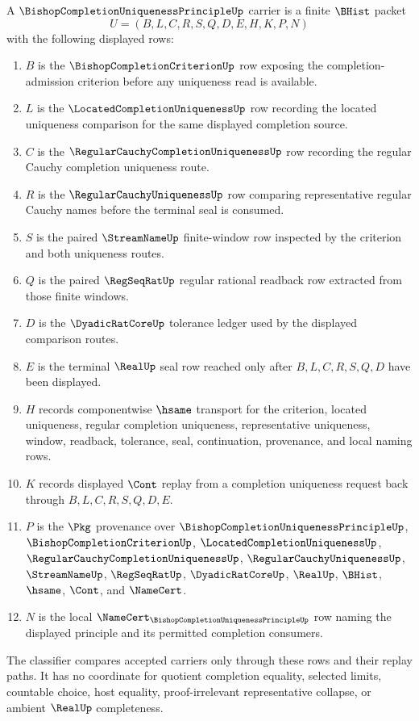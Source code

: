 \begin{definition}
\label{def:bishop-completion-uniqueness-principle-carrier}
A $\BishopCompletionUniquenessPrincipleUp$ carrier is a finite $\BHist$ packet
$$
U=(B,L,C,R,S,Q,D,E,H,K,P,N)
$$
with the following displayed rows:
\begin{enumerate}
\item $B$ is the $\BishopCompletionCriterionUp$ row exposing the completion-admission criterion before any uniqueness read is available.
\item $L$ is the $\LocatedCompletionUniquenessUp$ row recording the located uniqueness comparison for the same displayed completion source.
\item $C$ is the $\RegularCauchyCompletionUniquenessUp$ row recording the regular Cauchy completion uniqueness route.
\item $R$ is the $\RegularCauchyUniquenessUp$ row comparing representative regular Cauchy names before the terminal seal is consumed.
\item $S$ is the paired $\StreamNameUp$ finite-window row inspected by the criterion and both uniqueness routes.
\item $Q$ is the paired $\RegSeqRatUp$ regular rational readback row extracted from those finite windows.
\item $D$ is the $\DyadicRatCoreUp$ tolerance ledger used by the displayed comparison routes.
\item $E$ is the terminal $\RealUp$ seal row reached only after $B,L,C,R,S,Q,D$ have been displayed.
\item $H$ records componentwise $\hsame$ transport for the criterion, located uniqueness, regular completion uniqueness, representative uniqueness, window, readback, tolerance, seal, continuation, provenance, and local naming rows.
\item $K$ records displayed $\Cont$ replay from a completion uniqueness request back through $B,L,C,R,S,Q,D,E$.
\item $P$ is the $\Pkg$ provenance over $\BishopCompletionUniquenessPrincipleUp$, $\BishopCompletionCriterionUp$, $\LocatedCompletionUniquenessUp$, $\RegularCauchyCompletionUniquenessUp$, $\RegularCauchyUniquenessUp$, $\StreamNameUp$, $\RegSeqRatUp$, $\DyadicRatCoreUp$, $\RealUp$, $\BHist$, $\hsame$, $\Cont$, and $\NameCert$.
\item $N$ is the local $\NameCert_{\BishopCompletionUniquenessPrincipleUp}$ row naming the displayed principle and its permitted completion consumers.
\end{enumerate}
The classifier compares accepted carriers only through these rows and their replay paths. It has no coordinate for quotient completion equality, selected limits, countable choice, host equality, proof-irrelevant representative collapse, or ambient $\RealUp$ completeness.
\end{definition}

